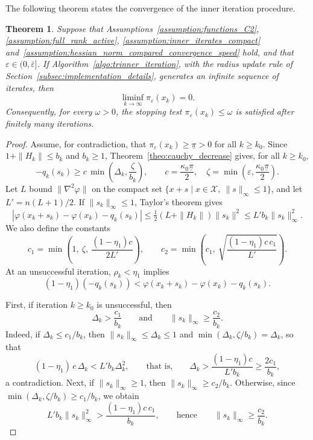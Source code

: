 \documentclass[pdflatex,sn-mathphys-num]{sn-jnl}%
\theoremstyle{thmstyleone}%
\newtheorem{theorem}{Theorem}%
\newcommand{\calX}{{\mathcal{X}}}
\newcommand{\rev}[1]{#1}
\begin{document}
The following theorem states the convergence of the inner \rev{iteration} procedure.
\begin{theorem}\label{theo:inner_convergence}
	Suppose that Assumptions~\ref{assumption:functions_C2}, \ref{assumption:full_rank_active}, \ref{assumption:inner_iterates_compact} and~\ref{assumption:hessian_norm_compared_convergence_speed} hold, and that $\varepsilon \in (0,\bar\varepsilon]$. If Algorithm~\ref{algo:trinner_iteration}\rev{, with the radius update rule of Section~\ref{subsec:implementation_details},} generates an infinite sequence of iterates, then
	\[\liminf_{k\to\infty} \pi_\varepsilon(x_k) = 0.\]
	Consequently, for every $\omega > 0$, the stopping test $\pi_\varepsilon(x_k) \le \omega$ is satisfied after finitely many iterations.
\end{theorem}
\begin{proof}
	Assume, for contradiction, that $\pi_\varepsilon(x_k) \ge \underline{\pi} > 0$ for all $k \ge k_0$. Since $1+\|H_k\| \le b_k$ and $b_k \ge 1$, Theorem~\ref{theo:cauchy_decrease} gives, for all $k \ge k_0$,
	\begin{equation}\label{eq:decrease_bk}
		-q_k(s_k) \ge c\,\min\left(\Delta_k, \frac{\zeta}{b_k}\right), \qquad c = \frac{\kappa_0\underline{\pi}}{2}, \quad \zeta = \min\left(\varepsilon, \frac{\kappa_0\underline{\pi}}{2}\right).
	\end{equation}
	Let $L$ bound $\|\nabla^2\varphi\|$ on the compact set $\{x+s \mid x \in \calX,\ \|s\|_\infty \le 1\}$, and let $L' = n(L+1)/2$. If $\|s_k\|_\infty \le 1$, Taylor's theorem gives
	\[\left|\varphi(x_k+s_k) - \varphi(x_k) - q_k(s_k)\right| \le \tfrac{1}{2}\left(L + \|H_k\|\right)\|s_k\|^2 \le L'b_k\|s_k\|_\infty^2.\]
	We also define the constants
	\[c_1 = \min\left(1,\ \zeta,\ \frac{(1-\eta_1)c}{2L'}\right), \qquad c_2 = \min\left(c_1,\ \sqrt{\frac{(1-\eta_1)c\,c_1}{L'}}\right).\]
	At an unsuccessful iteration, $\rho_k < \eta_1$ implies
	\[(1-\eta_1)\left(-q_k(s_k)\right) < \varphi(x_k+s_k) - \varphi(x_k) - q_k(s_k).\]

	First, if iteration $k \ge k_0$ is unsuccessful, then
	\[\Delta_k > \frac{c_1}{b_k} \qquad \text{and} \qquad \|s_k\|_\infty \ge \frac{c_2}{b_k}.\]
	Indeed, if $\Delta_k \le c_1/b_k$, then $\|s_k\|_\infty \le \Delta_k \le 1$ and $\min(\Delta_k,\zeta/b_k) = \Delta_k$, so that
	\[(1-\eta_1)\,c\,\Delta_k < L'b_k\Delta_k^2, \qquad \text{that is,} \qquad \Delta_k > \frac{(1-\eta_1)c}{L'b_k} \ge \frac{2c_1}{b_k},\]
	a contradiction. Next, if $\|s_k\|_\infty \ge 1$, then $\|s_k\|_\infty \ge c_2/b_k$. Otherwise, since $\min(\Delta_k,\zeta/b_k) \ge c_1/b_k$, we obtain
	\[L'b_k\|s_k\|_\infty^2 > \frac{(1-\eta_1)c\,c_1}{b_k}, \qquad \text{hence} \qquad \|s_k\|_\infty \ge \frac{c_2}{b_k}.\]


\end{proof}
\end{document}

